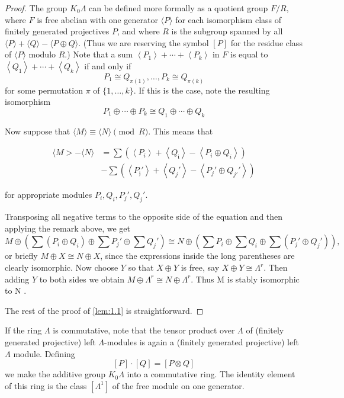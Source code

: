 \begin{proof}
	The group $K_{0} \Lambda$ can be defined more formally as a quotient group $F / R$, where $F$ is free abelian with one generator $\langle P\rangle$ for each isomorphism class of finitely generated projectives $P$, and where $R$ is the subgroup spanned by all $\langle P\rangle+\langle Q\rangle-\langle P \oplus Q\rangle$. (Thus we are reserving the symbol $[P]$ for the residue class of $\langle P\rangle$ modulo $R$.) Note that a sum $\left\langle P_{1}\right\rangle+\cdots+\left\langle P_{k}\right\rangle$ in $F$ is equal to $\left\langle Q_{1}\right\rangle+\cdots+\left\langle Q_{k}\right\rangle$ if and only if
\[
P_{1} \cong Q_{\pi(1)}, \ldots, P_{k} \cong Q_{\pi(k)}
\]
for some permutation $\pi$ of $\{1, \ldots, k\}$. If this is the case, note the resulting isomorphism
\[
P_{1} \oplus \cdots \oplus P_{k} \cong Q_{1} \oplus \cdots \oplus Q_{k}
\]

Now suppose that $\langle M\rangle \equiv\langle N\rangle \pmod{R}$. This means that

\begin{align*}
\langle M>-\langle N\rangle &=\sum\left(\left\langle P_{i}\right\rangle+\left\langle Q_{\mathfrak{i}}\right\rangle-\left\langle P_{i} \oplus Q_{\dot{i}}\right\rangle\right) \\
& -\sum\left(\left\langle P_{\mathfrak{j}}'\right\rangle+\left\langle Q_{j}'\right\rangle-\left\langle P_{j}' \oplus Q_{j'}'\right\rangle\right)
\end{align*}

for appropriate modules $P_{i}, Q_{i}, P_{j}', Q_{j}'$.

Transposing all negative terms to the opposite side of the equation and then applying the remark above, we get
\[
	M \oplus\left(\sum\left(P_{i} \oplus Q_{i}\right) \oplus \sum P_{j}' \oplus \sum Q_{j}'\right) \cong N \oplus\left(\sum P_{i} \oplus \sum Q_{i} \oplus \sum\left(P_{j}' \oplus Q_{j}'\right)\right),
\]
or briefly $M \oplus X \cong N \oplus X$, since the expressions inside the long parentheses are clearly isomorphic. Now choose $Y$ so that $X \oplus Y$ is free, say $X \oplus Y \cong \Lambda^{r}$. Then adding $Y$ to both sides we obtain $M \oplus \Lambda^{r} \cong N \oplus \Lambda^{r}$. Thus M is stably isomorphic to N .

The rest of the proof of \autoref{lem:1.1} is straightforward.
\end{proof}

If the ring $\Lambda$ is commutative, note that the tensor product over $\Lambda$ of (finitely generated projective) left $\Lambda$-modules is again a (finitely generated projective) left $\Lambda$ module. Defining
\[
[P] \cdot[Q]=[P \otimes Q]
\]
we make the additive group $K_{0} \Lambda$ into a commutative ring. The identity element of this ring is the class $\left[\Lambda^{1}\right]$ of the free module on one generator.

